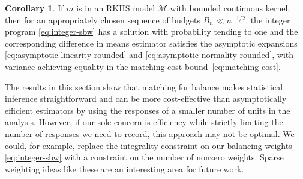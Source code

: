 \documentclass{article}
\theoremstyle{definition}
\newtheorem{corollary}[theorem]{Corollary}
\DeclarePairedDelimiter\round{\lfloor}{\rceil}
\newcommand{\htheta}{\hat\theta}
\newcommand{\model}{\mathcal{M}}
\newcommand{\<}{\langle}
\renewcommand{\>}{\rangle}
\begin{document}
\begin{corollary}
\label{cor:integer-sbw}
If $m$ is in an RKHS model $\model$ with bounded continuous kernel, then for an appropriately chosen sequence of budgets $B_n \ll n^{-1/2}$, the integer program \eqref{eq:integer-sbw} has a solution with probability tending to one and the corresponding difference in means estimator \smash{$\hat\psi^{match}=\frac{1}{N_1}\sum_{i=1}^n W_iY_i - \overset{\neg}W_i \round{\htheta}_i Y_i$} satisfies the asymptotic expansions \eqref{eq:asymptotic-linearity-rounded} and \eqref{eq:asymptotic-normality-rounded}, with variance achieving equality in the matching cost bound~\eqref{eq:matching-cost}.
\end{corollary}

The results in this section show that matching for balance makes statistical inference straightforward and can be more cost-effective than asymptotically efficient estimators by using the responses of a smaller number of units in the analysis.
However, if our sole concern is efficiency while strictly limiting the number of responses we need to record, this approach may not be optimal.
We could, for example, replace the integrality constraint on our balancing weights \eqref{eq:integer-sbw} with a constraint on the number of nonzero weights. Sparse weighting ideas like these are an interesting area for future work.



\end{document}
